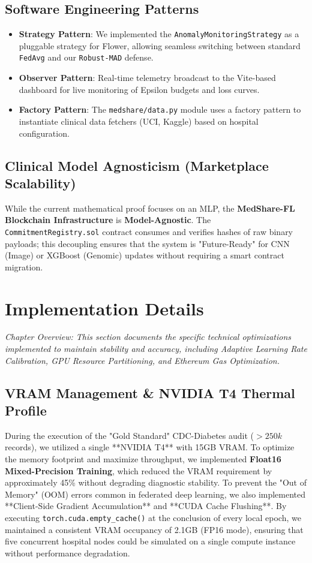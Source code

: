 \documentclass[10pt, a4paper, twocolumn]{article}
\begin{document}
\subsection{Software Engineering Patterns}
\begin{itemize}
    \item \textbf{Strategy Pattern}: We implemented the \texttt{AnomalyMonitoringStrategy} as a pluggable strategy for Flower, allowing seamless switching between standard \texttt{FedAvg} and our \texttt{Robust-MAD} defense.
    \item \textbf{Observer Pattern}: Real-time telemetry broadcast to the Vite-based dashboard for live monitoring of Epsilon budgets and loss curves.
    \item \textbf{Factory Pattern}: The \texttt{medshare/data.py} module uses a factory pattern to instantiate clinical data fetchers (UCI, Kaggle) based on hospital configuration.
\end{itemize}

\subsection{Clinical Model Agnosticism (Marketplace Scalability)}
While the current mathematical proof focuses on an MLP, the \textbf{MedShare-FL Blockchain Infrastructure} is \textbf{Model-Agnostic}. The \texttt{CommitmentRegistry.sol} contract consumes and verifies hashes of raw binary payloads; this decoupling ensures that the system is "Future-Ready" for CNN (Image) or XGBoost (Genomic) updates without requiring a smart contract migration.

\section{Implementation Details}

\textit{Chapter Overview: This section documents the specific technical optimizations implemented to maintain stability and accuracy, including Adaptive Learning Rate Calibration, GPU Resource Partitioning, and Ethereum Gas Optimization.}

\subsection{VRAM Management \& NVIDIA T4 Thermal Profile}
During the execution of the "Gold Standard" CDC-Diabetes audit ($>250k$ records), we utilized a single **NVIDIA T4** with 15GB VRAM. To optimize the memory footprint and maximize throughput, we implemented \textbf{Float16 Mixed-Precision Training}, which reduced the VRAM requirement by approximately 45\% without degrading diagnostic stability. To prevent the "Out of Memory" (OOM) errors common in federated deep learning, we also implemented **Client-Side Gradient Accumulation** and **CUDA Cache Flushing**. By executing \texttt{torch.cuda.empty\_cache()} at the conclusion of every local epoch, we maintained a consistent VRAM occupancy of 2.1GB (FP16 mode), ensuring that five concurrent hospital nodes could be simulated on a single compute instance without performance degradation.
\end{document}
